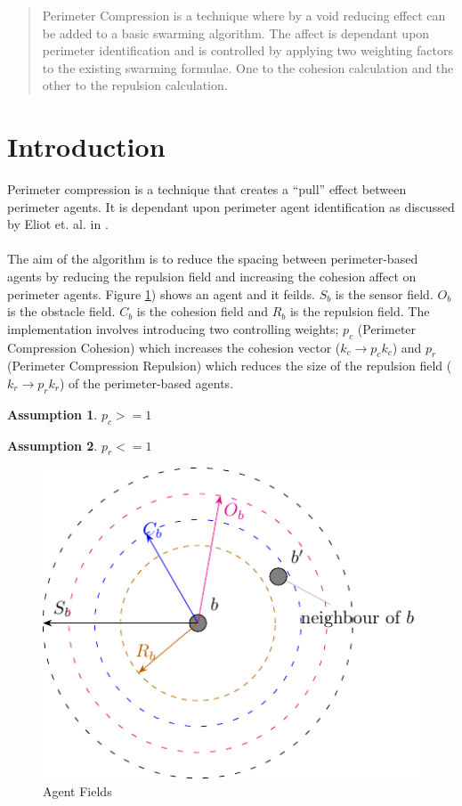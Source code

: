 \documentclass[12pt,a4paper]{article}
\newtheorem{assumption}{Assumption}
\begin{document}
\maketitle

\begin{abstract}
Perimeter Compression is a technique where by a void reducing effect can be added to a basic swarming algorithm. The affect is dependant upon perimeter identification and is controlled by applying two weighting factors to the existing swarming formulae. One to the cohesion calculation and the other to the repulsion calculation.
\end{abstract}

\section{Introduction}
Perimeter compression is a technique that creates a ``pull'' effect between perimeter agents. It is dependant upon perimeter agent identification as discussed by Eliot et. al. in \cite{eliot2017methods, eliot2018metric, eliot2019void}.
\paragraph{}
The aim of the algorithm is to reduce the spacing between perimeter-based agents by reducing the repulsion field and increasing the cohesion affect on perimeter agents. Figure \ref{fig:stableswarm}) shows an agent and it feilds. $S_b$ is the sensor field. $O_b$ is the obstacle field. $C_b$ is the cohesion field and $R_b$ is the repulsion field. The implementation involves introducing two controlling weights; $p_c$ (Perimeter Compression Cohesion) which increases the cohesion vector ($k_c\rightarrow p_ck_c$) and $p_r$ (Perimeter Compression Repulsion) which reduces the size of the repulsion field ($k_r\rightarrow p_rk_r$) of the perimeter-based agents.
\begin{assumption}
	$p_c >= 1$
\end{assumption}
\begin{assumption}
	$p_r <= 1$
\end{assumption}
\begin{figure}[H]
	\centering
	\includegraphics[width=0.4\linewidth]{figures/stableswarm}
	\caption[Agent Fields]{Agent Fields}
	\label{fig:stableswarm}
\end{figure}
\end{document}
